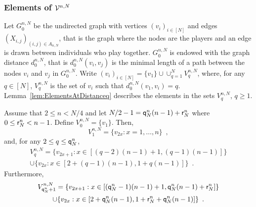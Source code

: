\subsubsection*{Elements of $\mathcal{V}^{n,N}$}
Let $G_0^{n,N}$ be the undirected graph with vertices $(v_i)_{i\in[N]}$ and edges $(X_{i,j})_{ (i,j)\in A_{n,N}}$, that is the graph where the nodes are the players and an edge is drawn between individuals who play together. $G_0^{n,N}$ is endowed with the graph distance $d^{n,N}_0$, that is $d^{n,N}_0(v_i,v_j)$ is the minimal length of a path between the nodes $v_i$ and $v_j$ in $G_0^{n,N}$. Write $(v_i)_{i\in[N]}=\{v_1\}\cup\cup_{q=1}^{N}V^{n,N}_{q}$, where, for any $q\in[N]$, $V^{n,N}_{q}$ is the set of $v_i$ such that $d^{n,N}_0(v_1,v_i)=q$. Lemma~\ref{lem:ElementsAtDistanceq} describes the elements in the sets $V_{q}^{n,N}$, $q\ge 1$. 
\begin{lemma}\label{lem:ElementsAtDistanceq} Assume that $2\le n<N/4$ and let $N/2-1= {\mathsf{q}}^{n}_{N}(n-1)+{\mathsf{r}}^{n}_{N}$ where $0\le {\mathsf{r}}^{n}_{N}<n-1$. Define $V_{0}^{n,N}=\{v_1\}$. Then, 
\begin{equation}\label{def:V1}
V_{1}^{n,N}=\{v_{2x} : x=1,\ldots,n\}\enspace, 
\end{equation}
and, for any $2\le q \le {\mathsf{q}}^{n}_{N}$, 
\begin{multline}\label{def:Vq}
V_{q}^{n,N}=\{v_{2x+1} : x\in[(q-2)(n-1)+1,(q-1)(n-1)]\}\\
\cup\{v_{2x} : x\in[2+(q-1)(n-1),1+q(n-1)]\}\enspace.
\end{multline}
Furthermore,
\begin{multline}\label{def:Vq01'}
V_{{\mathsf{q}}^{n}_{N}+1}^{n,N}=\{v_{2x+1} : x\in[({\mathsf{q}}^{n}_{N}-1)(n-1)+1,{\mathsf{q}}^{n}_{N}(n-1)+{\mathsf{r}}^{n}_{N}]\}\\
\cup\{v_{2x} : x\in[2+{\mathsf{q}}^{n}_{N}(n-1),1+{\mathsf{r}}^{n}_{N}+{\mathsf{q}}^{n}_{N}(n-1)]\}\enspace.
\end{multline}
\end{lemma}
